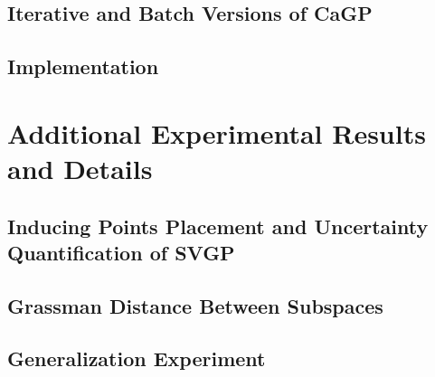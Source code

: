 \subsection{Iterative and Batch Versions of CaGP}

\subsection{Implementation}
\label{sec:implementation}

\newpage

\section{Additional Experimental Results and Details}

\subsection{Inducing Points Placement and Uncertainty Quantification of SVGP}

\subsection{Grassman Distance Between Subspaces}


\subsection{Generalization Experiment}






\stopcontents[supplementary]
